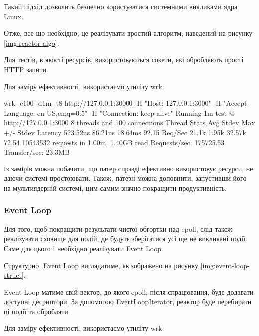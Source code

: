 \documentclass{lib/styles/default-style}
\begin{document}
    Такий підхід дозволить безпечно користуватися системними викликами ядра Linux.

    Отже, все що необхідно, це реалізувати простий алгоритм, наведений на рисунку \ref{img:reactor-algo}.


    Для тестів, в якості ресурсів, використовуються сокети, які обробляють прості HTTP запити.

    Для заміру ефективності, використаємо утиліту wrk:

    \begin{snippet}
        wrk -c100 -d1m -t8 http://127.0.0.1:30000 -H "Host: 127.0.0.1:3000" -H "Accept-Language: en-US,en;q=0.5" -H "Connection: keep-alive"
        Running 1m test @ http://127.0.0.1:3000
        8 threads and 100 connections
        Thread Stats   Avg      Stdev     Max   +/- Stdev
            Latency   523.52us   86.21us  18.64ms   92.15%
            Req/Sec    21.1k     1.95k   32.57k    72.54%
        10543532 requests in 1.00m, 1.40GB read
        Requests/sec: 175725.53
        Transfer/sec:     23.3MB
    \end{snippet}

    Із замірів можна побачити, що патер справді ефективно використовує ресурси, не даючи системі простоювати.
    Також, патерн можна доповнити, запустивши його на мультиядерній системі, цим самим значно покращити продуктивність.

    \subsubsection{Event Loop}
    
    Для того, щоб покращити результати чистої обгортки над epoll,
    слід також реалізувати сховище для подій, де будуть зберігатися усі ще не викликані події. 
    Саме для цього і необхідно реалізувати Event Loop.

    Структурно, Event Loop виглядатиме, як зображено на рисунку \ref{img:event-loop-struct}.


    Event Loop матиме свій вектор, до якого epoll, після спрацювання, буде додавати доступні десриптори.
    За допомогою EventLoopIterator, реактор буде перебирати ці події та обробляти.

    Для заміру ефективності, використаємо утиліту wrk:
\end{document}
